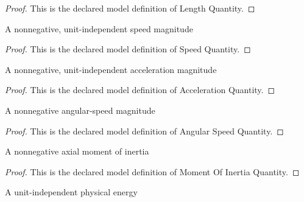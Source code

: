 \begin{proof}
  This is the declared model definition of Length Quantity.
\end{proof}
\begin{definition}
  \label{def:physics:phyx-mini-0774:phyxminiproblems-problemphyxmini0774-speedquantity}
  A nonnegative, unit-independent speed magnitude
\end{definition}
\begin{proof}
  This is the declared model definition of Speed Quantity.
\end{proof}
\begin{definition}
  \label{def:physics:phyx-mini-0774:phyxminiproblems-problemphyxmini0774-accelerationquantity}
  A nonnegative, unit-independent acceleration magnitude
\end{definition}
\begin{proof}
  This is the declared model definition of Acceleration Quantity.
\end{proof}
\begin{definition}
  \label{def:physics:phyx-mini-0774:phyxminiproblems-problemphyxmini0774-angularspeedquantity}
  A nonnegative angular-speed magnitude
\end{definition}
\begin{proof}
  This is the declared model definition of Angular Speed Quantity.
\end{proof}
\begin{definition}
  \label{def:physics:phyx-mini-0774:phyxminiproblems-problemphyxmini0774-momentofinertiaquantity}
  A nonnegative axial moment of inertia
\end{definition}
\begin{proof}
  This is the declared model definition of Moment Of Inertia Quantity.
\end{proof}
\begin{definition}
  \label{def:physics:phyx-mini-0774:phyxminiproblems-problemphyxmini0774-energyquantity}
  A unit-independent physical energy
\end{definition}
